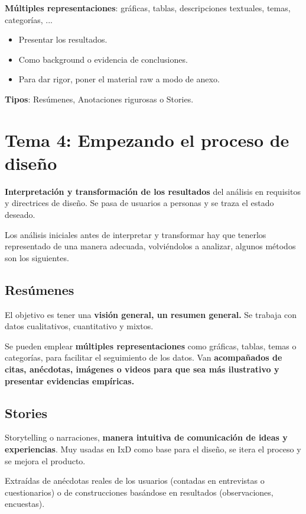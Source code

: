 \documentclass[12pt, twoside, openright]{report} %
\begin{document}
\textbf{Múltiples representaciones}: gráficas, tablas, descripciones textuales, temas, categorías, ...

\begin{itemize}
	\item Presentar los resultados.
	\item Como background o evidencia de conclusiones.
	\item Para dar rigor, poner el material raw a modo de anexo.
\end{itemize}

\textbf{Tipos}: Resúmenes, Anotaciones rigurosas o Stories.

\chapter{Tema 4: Empezando el proceso de diseño}

\textbf{Interpretación y transformación de los resultados} del análisis
en requisitos y directrices de diseño. Se pasa de usuarios a personas y
se traza el estado deseado.

Los análisis iniciales antes de interpretar y transformar hay que
tenerlos representado de una manera adecuada, volviéndolos a analizar,
algunos métodos son los siguientes.

\section{Resúmenes}

El objetivo es tener una \textbf{visión general, un resumen general.} Se
trabaja con datos cualitativos, cuantitativo y mixtos.

Se pueden emplear \textbf{múltiples representaciones} como gráficas,
tablas, temas o categorías, para facilitar el seguimiento de los datos.
Van \textbf{acompañados de citas, anécdotas, imágenes o videos para que
	sea más ilustrativo y presentar evidencias empíricas.}

\section{Stories}

Storytelling o narraciones, \textbf{manera intuitiva de comunicación de
	ideas y experiencias}. Muy usadas en IxD como base para el diseño, se
itera el proceso y se mejora el producto.

Extraídas de anécdotas reales de los usuarios (contadas en entrevistas o
cuestionarios) o de construcciones basándose en resultados (observaciones,
encuestas).
\end{document}
